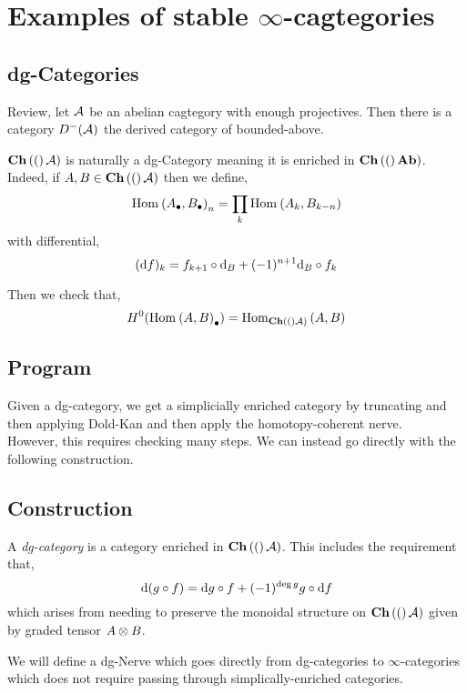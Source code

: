 \documentclass[12pt]{article}
\begin{document}
\section{Examples of stable $\infty$-cagtegories}

\subsection{dg-Categories}

Review, let $\mathcal{A}$ be an abelian cagtegory with enough projectives. Then there is a category $D^-(\mathcal{A})$ the derived category of bounded-above.


$\mathbf{Ch}\left( ( \right)\mathcal{A})$ is naturally a dg-Category meaning it is enriched in $\mathbf{Ch}\left( ( \right)\mathbf{Ab})$. Indeed, if $A, B \in \mathbf{Ch}\left( ( \right)\mathcal{A})$ then we define,
\[ \mathrm{Hom}_{} \left( A_\bullet, B_\bullet \right)_n = \prod_{k} \mathrm{Hom}_{} \left( A_k, B_{k-n} \right) \]
with differential,
\[ (\mathrm{d} f)_k = f_{k+1} \circ \mathrm{d}_B + (-1)^{n+1} \mathrm{d}_B \circ f_k \]

Then we check that,
\[ H^0(\mathrm{Hom}_{} \left( A, B \right)_\bullet) = \mathrm{Hom}_{\mathbf{Ch}\left( ( \right)\mathcal{A})} \left( A, B \right) \]

\subsection{Program}

Given a dg-category, we get a simplicially enriched category by truncating and then applying Dold-Kan and then apply the homotopy-coherent nerve. 
\bigskip\\
However, this requires checking many steps. We can instead go directly with the following construction. 

\subsection{Construction}

\newcommand{\dg}{\mathrm{dg}}

\begin{defn}
A \textit{dg-category} is a category enriched in $\mathbf{Ch}\left( ( \right)\mathcal{A})$. This includes the requirement that,
\[ \mathrm{d}{(g \circ f)} = \mathrm{d}{g} \circ f + (-1)^{\deg{g}} g \circ \mathrm{d}{f} \]
which arises from needing to preserve the monoidal structure on $\mathbf{Ch}\left( ( \right)\mathcal{A})$ given by graded tensor $A \otimes B$. 
\end{defn}

We will define a dg-Nerve which goes directly from dg-categories to $\infty$-categories which does not require passing through simplically-enriched categories.
\end{document}
